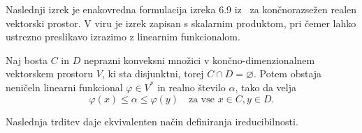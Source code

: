\documentclass[mat2, tisk]{fmfdelo}
\begin{document}
Naslednji izrek je enakovredna formulacija izreka 6.9 iz~\cite{guler2010} 
za končnorazsežen realen vektorski prostor. V viru je izrek zapisan s skalarnim produktom, 
pri čemer lahko ustrezno preslikavo izrazimo z linearnim funkcionalom.
\begin{izrek}\label{HahnBanach}
  Naj bosta \(C\) in \(D\) neprazni konveksni množici v končno-dimenzionalnem vektorskem prostoru \(V\),
  ki sta disjunktni, torej \(C \cap D = \varnothing\). Potem obstaja neničeln linearni funkcional 
  \(\varphi \in V^*\)
  in realno število \(\alpha\), tako da velja
  \[
  \varphi(x) \leq \alpha \leq \varphi(y) \quad \text{za vse } x \in C, y \in D.
  \]
\end{izrek}

Naslednja trditev daje ekvivalenten način definiranja ireducibilnosti.
\end{document}
